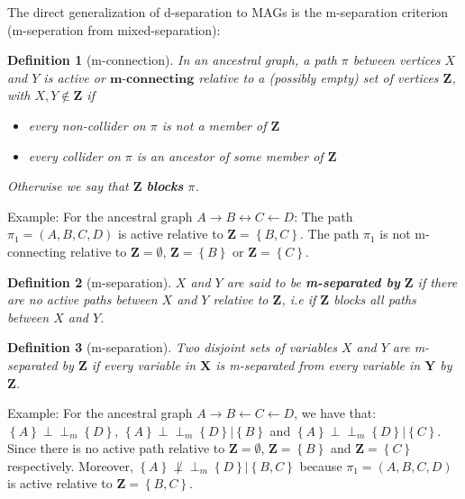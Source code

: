 \documentclass[a4paper]{article}
\newtheorem{definition}{Definition}
\begin{document}
The direct generalization of d-separation to MAGs is the m-separation criterion (m-seperation from mixed-separation):

\begin{definition}[m-connection]In an ancestral graph, a path $\pi$ between vertices $X$ and $Y$ is active or $\textbf{m-connecting}$ relative to a (possibly empty) set of vertices $\textbf{Z}$, with $X,Y \not \in \mathbf{Z}$ if 
	
	\begin{itemize}
		\item every non-collider on $\pi$ is not a member of $\mathbf{Z}$
		\item every collider on $\pi$ is an ancestor of some member of $\mathbf{Z}$
	\end{itemize}
	Otherwise we say that $\mathbf{Z}$ \textbf{blocks} $\pi$.
\end{definition}

Example: For the ancestral graph $A \rightarrow B \leftrightarrow C \leftarrow D$: The path $\pi_1 = (A,B,C,D)$ is active relative to $\mathbf{Z} = \left\{ B,C \right\}$. The path $\pi_1$ is not m-connecting relative to $\mathbf{Z} = \emptyset$, $\mathbf{Z} = \left\{ B \right\}$ or $\mathbf{Z} = \left\{ C\right\}$.

\begin{definition}[m-separation] $X$ and $Y$ are said to be \textbf{m-separated by} $\mathbf{Z}$ if there are no active paths between $X$ and $Y$ relative to $\mathbf{Z}$, i.e if $\mathbf{Z}$ blocks all paths between $X$ and $Y$.
\end{definition}

\begin{definition}[m-separation]Two disjoint sets of variables $X$ and $Y$ are m-separated by $\mathbf{Z}$ if every variable in $\mathbf{X}$ is m-separated from every variable in $\mathbf{Y}$ by $\mathbf{Z}$.
\end{definition}

Example: For the ancestral graph $A \rightarrow B \leftarrow C \leftarrow D$, we have that: $\left\{ A\right\} \perp\!\!\!\perp_m \left\{ D \right\}$, $\left\{ A\right\} \perp\!\!\!\perp_m \left\{ D \right\} | \left\{ B \right\}$ and $\left\{ A\right\} \perp\!\!\!\perp_m \left\{ D \right\} | \left\{ C\right\}$. Since there is no active path relative to $\mathbf{Z} = \emptyset$, $\mathbf{Z} = \left\{ B \right\}$ and $\mathbf{Z} = \left\{ C \right\}$ respectively. Moreover, $\left\{ A\right\} \not \perp\!\!\!\perp_m \left\{ D \right\} | \left\{ B, C\right\}$ because $\pi_1 = (A,B,C,D)$ is active relative to $\mathbf{Z} = \left\{ B,C \right\}$. \\
\end{document}
